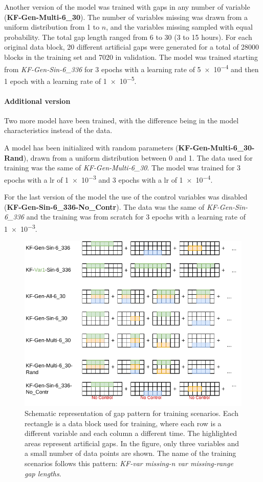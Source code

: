 \documentclass{article}
\begin{document}
Another version of the model was trained with gaps in any number of variable (\textbf{KF-Gen-Multi-6\_30}). The number of variables missing was drawn from a uniform distribution  from 1 to $n$, and the variables missing sampled with equal probability. The total gap length ranged from 6 to 30 (3 to 15 hours). For each original data block, 20 different artificial gaps were generated for a total of 28000 blocks in the training set and 7020 in validation. The model was trained starting from \textit{KF-Gen-Sin-6\_336} for 3 epochs with a learning rate of \num{5e-4} and then 1 epoch with a learning rate of \num{1e-5}.

\paragraph{Additional version} Two more model have been trained, with the difference being in the model characteristics instead of the data.

A model has been initialized with random parameters (\textbf{KF-Gen-Multi-6\_30-Rand}), drawn from a uniform distribution between 0 and 1. The data used for training was the same of  \textit{KF-Gen-Multi-6\_30}. The model was trained for 3 epochs with a lr of \num{1e-3} and 3 epochs with a lr of \num{1e-4}.

For the last version of the model the use of the control variables was disabled (\textbf{KF-Gen-Sin-6\_336-No\_Contr}). The data was the same of \textit{KF-Gen-Sin-6\_336} and the training was from scratch for \num{3} epochs with a learning rate of \num{1e-3}.

\begin{figure}
\centerline{\includegraphics[width=\textwidth]{training scenarios}}
\caption{Schematic representation of gap pattern for training scenarios. Each rectangle is a data block used for training, where each row is a different variable and each column a different time. The highlighted areas represent artificial gaps. In the figure, only three variables and a small number of data points are shown. The name of the training scenarios follows this pattern: \textit{KF-\textlangle var missing\textrangle-\textlangle n var missing\textrangle-\textlangle range gap lengths}.}
\label{fig:training}
\end{figure}
\end{document}
